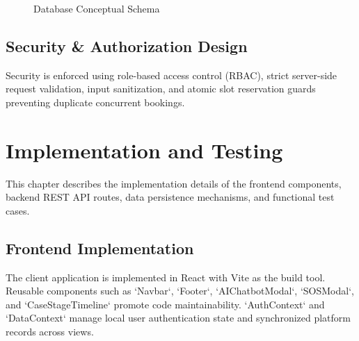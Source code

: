 \documentclass[12pt,a4paper]{report}
\begin{document}
\begin{figure}[h!]
    \centering
    \caption{Database Conceptual Schema}
    \label{fig:db_schema}
\end{figure}

\section{Security \& Authorization Design}
Security is enforced using role-based access control (RBAC), strict server-side request validation, input sanitization, and atomic slot reservation guards preventing duplicate concurrent bookings.

\chapter{Implementation and Testing}

This chapter describes the implementation details of the frontend components, backend REST API routes, data persistence mechanisms, and functional test cases.

\section{Frontend Implementation}
The client application is implemented in React with Vite as the build tool. Reusable components such as `Navbar`, `Footer`, `AIChatbotModal`, `SOSModal`, and `CaseStageTimeline` promote code maintainability. `AuthContext` and `DataContext` manage local user authentication state and synchronized platform records across views.
\end{document}
